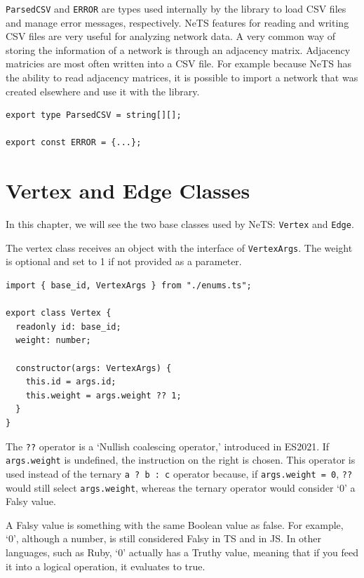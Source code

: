 \texttt{ParsedCSV} and \texttt{ERROR} are types used internally
by the library to load CSV files and manage error messages, respectively.
NeTS features for reading and writing CSV files are very useful for
analyzing network data.
A very common way of storing the information of a network is
through an adjacency matrix.
Adjacency matricies are most often written into a CSV file.
For example because NeTS has the ability to read adjacency matrices,
it is possible to import a network that was created elsewhere
and use it with the library.

\begin{verbatim}
export type ParsedCSV = string[][];

export const ERROR = {...};
\end{verbatim}

\section{Vertex and Edge Classes}

In this chapter, we will see the two base classes used by NeTS:
\texttt{Vertex} and \texttt{Edge}.

The vertex class receives an object with the interface of \texttt{VertexArgs}.
The weight is optional and set to 1 if not provided as a parameter.

\begin{verbatim}
import { base_id, VertexArgs } from "./enums.ts";

export class Vertex {
  readonly id: base_id;
  weight: number;

  constructor(args: VertexArgs) {
    this.id = args.id;
    this.weight = args.weight ?? 1;
  }
}
\end{verbatim}

The \texttt{??} operator is a `Nullish coalescing operator,' introduced in ES2021.
If \texttt{args.weight} is undefined, the instruction on the right is chosen.
This operator is used instead of the ternary \texttt{a ? b : c} operator
because, if \texttt{args.weight = 0},
\texttt{??} would still select \texttt{args.weight},
whereas the ternary operator would consider `0' a Falsy value.

A Falsy value is something with the same Boolean value as false.
For example, `0', although a number, is still considered Falsy in TS and in JS.
In other languages, such as Ruby, `0' actually has a Truthy value,
meaning that if you feed it into a logical operation, it evaluates to true.

